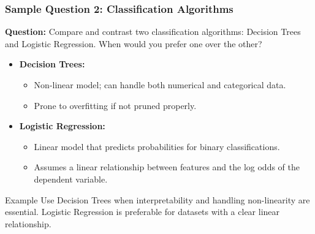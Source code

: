 \documentclass{beamer}
\begin{document}
\begin{frame}[fragile]
    \frametitle{Sample Question 2: Classification Algorithms}
    \textbf{Question:} Compare and contrast two classification algorithms: Decision Trees and Logistic Regression. When would you prefer one over the other?
    
    \begin{itemize}
        \item \textbf{Decision Trees:}
        \begin{itemize}
            \item Non-linear model; can handle both numerical and categorical data.
            \item Prone to overfitting if not pruned properly.
        \end{itemize}
        
        \item \textbf{Logistic Regression:}
        \begin{itemize}
            \item Linear model that predicts probabilities for binary classifications.
            \item Assumes a linear relationship between features and the log odds of the dependent variable.
        \end{itemize}
    \end{itemize}

    \begin{block}{Example}
        Use Decision Trees when interpretability and handling non-linearity are essential. Logistic Regression is preferable for datasets with a clear linear relationship.
    \end{block}
\end{frame}
\end{document}
